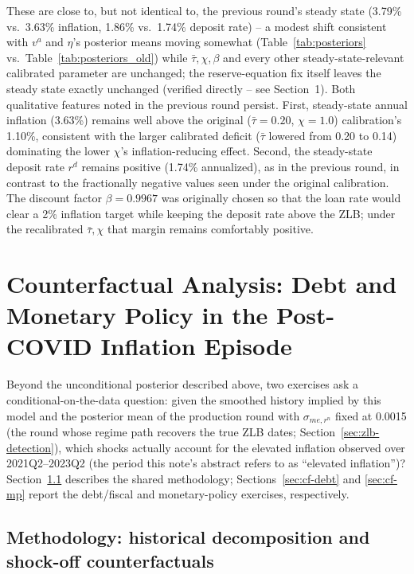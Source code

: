 \documentclass[11pt]{article}
\begin{document}
These are close to, but not identical to, the previous round's steady
state (3.79\% vs.\ 3.63\% inflation, 1.86\% vs.\ 1.74\% deposit rate) --
a modest shift consistent with $v^a$ and $\eta$'s posterior means moving
somewhat (Table~\ref{tab:posteriors} vs.\ Table~\ref{tab:posteriors_old})
while $\bar\tau,\chi,\beta$ and every other steady-state-relevant
calibrated parameter are unchanged; the reserve-equation fix itself
leaves the steady state exactly unchanged (verified directly -- see
Section~1). Both qualitative features noted in the previous round persist.
First, steady-state annual inflation (3.63\%) remains well above the
original ($\bar\tau=0.20$, $\chi=1.0$) calibration's 1.10\%, consistent
with the larger calibrated deficit ($\bar\tau$ lowered from 0.20 to
0.14) dominating the lower $\chi$'s inflation-reducing effect. Second,
the steady-state deposit rate $r^d$ remains positive (1.74\% annualized),
as in the previous round, in contrast to the fractionally negative
values seen under the original calibration. The discount factor
$\beta=0.9967$ was originally chosen so that the loan rate would clear a
2\% inflation target while keeping the deposit rate above the ZLB; under
the recalibrated $\bar\tau,\chi$ that margin remains comfortably
positive.

\section{Counterfactual Analysis: Debt and Monetary Policy in the Post-COVID Inflation Episode}
\label{sec:counterfactual}

Beyond the unconditional posterior described above, two exercises ask a
conditional-on-the-data question: given the smoothed history implied by
this model and the posterior mean of the production round with
$\sigma_{me,r^n}$ fixed at 0.0015 (the round whose regime path recovers the
true ZLB dates; Section~\ref{sec:zlb-detection}), which shocks actually account for the
elevated inflation observed over 2021Q2--2023Q2 (the period this note's
abstract refers to as ``elevated inflation'')? Section~\ref{sec:cf-method}
describes the shared methodology; Sections~\ref{sec:cf-debt} and
\ref{sec:cf-mp} report the debt/fiscal and monetary-policy exercises,
respectively.

\subsection{Methodology: historical decomposition and shock-off counterfactuals}
\label{sec:cf-method}
\end{document}
